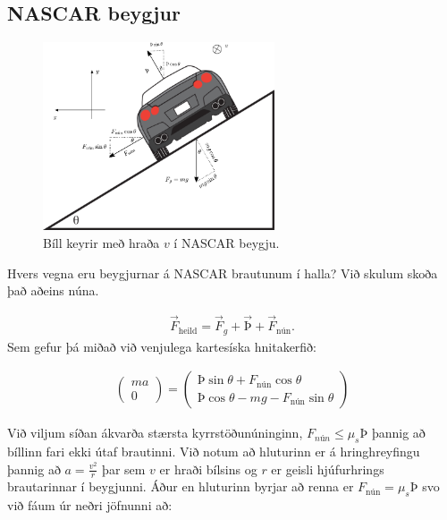\ifdefined \wholebook \else\documentclass[oneside]{book}\usepackage{EdlBook}\graphicspath{{figures/}}
\begin{document}
\newpage

\subsection*{NASCAR beygjur}

\begin{minipage}{\linewidth}
\begin{figure}
\vspace{-1cm}
\centering
\includegraphics[width=2.7in]{figures/bill.pdf}
\caption{Bíll keyrir með hraða $v$ í NASCAR beygju.}
\label{fig:bill}
\end{figure}

Hvers vegna eru beygjurnar á NASCAR brautunum í halla? Við skulum skoða það aðeins núna.

\begin{align*}
    \vec{F}_{\text{heild}} = \vec{F}_g + \vec{\text{Þ}} + \vec{F}_{\text{nún}}.
\end{align*}
Sem gefur þá miðað við venjulega kartesíska hnitakerfið:

\begin{align*}
    \begin{pmatrix} m a \\ 0 \end{pmatrix} = \begin{pmatrix} \text{Þ}\sin\theta + F_{\text{nún}}\cos\theta \\ \text{Þ}\cos\theta - mg - F_{\text{nún}}\sin\theta \end{pmatrix}
\end{align*}

Við viljum síðan ákvarða stærsta kyrrstöðunúninginn, $F_{nún} \leq \mu_s \text{Þ}$ þannig að bíllinn fari ekki útaf brautinni. Við notum að hluturinn er á hringhreyfingu þannig að $a = \frac{v^2}{r}$ þar sem $v$ er hraði bílsins og $r$ er geisli hjúfurhrings brautarinnar í beygjunni. Áður en hluturinn byrjar að renna er $F_{\text{nún}} = \mu_s \text{Þ}$ svo við fáum úr neðri jöfnunni að:


\end{minipage}
\end{document}
